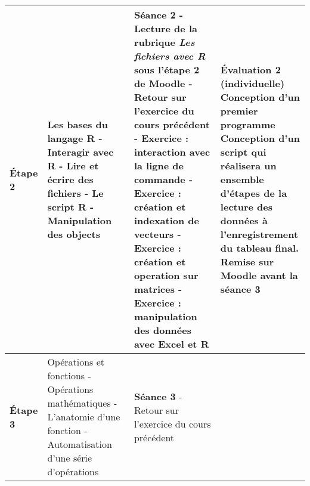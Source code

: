 \documentclass[12]{article}
\begin{document}
\begin{center}
\begin{tabular}{| p{0.1\linewidth} | p{0.3\linewidth} | p{0.3\linewidth} | p{0.3\linewidth} | }
        \textbf{Étape 2} \linebreak &
        Les bases du langage R\hfill\hfill \linebreak\linebreak 
            - Interagir avec R\hfill\hfill \linebreak
            - Lire et écrire des fichiers\hfill\hfill \linebreak
            - Le script R\hfill\hfill \linebreak
            - Manipulation des objects\hfill\hfill &
        \textbf{Séance 2} \linebreak
        - Lecture de la rubrique \textit{Les fichiers avec R} sous l'étape 2 de Moodle\hfill\hfill \linebreak
        - Retour sur l'exercice du cours précédent\hfill\hfill \linebreak
        - Exercice : interaction avec la ligne de commande\hfill\hfill \linebreak
        - Exercice : création et indexation de vecteurs\hfill\hfill \linebreak
        - Exercice : création et operation sur matrices\hfill\hfill \linebreak
        - Exercice : manipulation des données avec Excel et R\hfill\hfill &
        \textbf{Évaluation 2} (individuelle) \linebreak
        \textbf{Conception d'un premier programme}\hfill\hfill \linebreak
        Conception d'un script qui réalisera un ensemble d'étapes de la lecture
        des données à l'enregistrement du tableau final. Remise sur Moodle
        avant la séance 3 \hfill\hfill\hfill \\
        \hline
        \textbf{Étape 3} \linebreak &
        Opérations et fonctions\hfill\hfill \linebreak\linebreak 
            - Opérations mathématiques\hfill\hfill \linebreak
            - L'anatomie d'une fonction\hfill\hfill \linebreak
            - Automatisation d'une série d'opérations\hfill &
        \textbf{Séance 3} \linebreak
        - Retour sur l'exercice du cours précédent\hfill\hfill \linebreak

\end{tabular}
\end{center}
\end{document}
